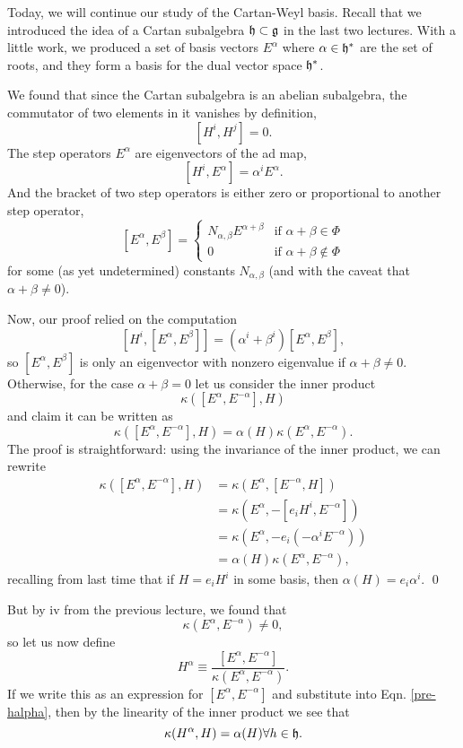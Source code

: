 Today, we will continue our study of the Cartan-Weyl basis. Recall that we introduced the idea of a Cartan subalgebra $\mathfrak{h}\subset \mathfrak{g}$ in the last two lectures. With a little work, we produced a set of basis vectors $E^\alpha$ where $\alpha\in \mathfrak{h}^*$ are the set of roots, and they form a basis for the dual vector space $\mathfrak{h}^*$.

We found that since the Cartan subalgebra is an abelian subalgebra, the commutator of two elements in it vanishes by definition,
$$[H^i,H^j]=0.$$
The step operators $E^\alpha$ are eigenvectors of the ad map,
$$[H^i,E^\alpha]=\alpha^i E^\alpha.$$
And the bracket of two step operators is either zero or proportional to another step operator,
$$[E^\alpha,E^\beta]=\begin{cases}
N_{\alpha,\beta}E^{\alpha+\beta} & \text{if }\alpha+\beta\in \Phi\\
0 & \text{if }\alpha+\beta\not\in \Phi
\end{cases}
$$
for some (as yet undetermined) constants $N_{\alpha,\beta}$ (and with the caveat that $\alpha+\beta\neq 0$).

Now, our proof relied on the computation
$$[H^i,[E^\alpha,E^\beta]]=(\alpha^i+\beta^i)[E^\alpha, E^\beta],$$
so $[E^\alpha,E^\beta]$ is only an eigenvector with nonzero eigenvalue if $\alpha+\beta \neq 0.$
Otherwise, for the case $\alpha+\beta=0$ let us consider the inner product
$$\kappa([E^\alpha,E^{-\alpha}],H)$$
and claim it can be written as
\begin{equation}\label{pre-halpha}
  \kappa([E^\alpha,E^{-\alpha}],H) =\alpha(H)\kappa(E^\alpha,E^{-\alpha}).
\end{equation}
The proof is straightforward: using the invariance of the inner product, we can rewrite
\begin{align*}
\kappa([E^\alpha,E^{-\alpha}],H)&=\kappa(E^\alpha,[E^{-\alpha},H])\\
&=\kappa(E^\alpha,-[e_i H^i,E^{-\alpha}])\\
&=\kappa(E^\alpha,-e_i (-\alpha^i E^{-\alpha}))\\
&=\alpha(H) \kappa(E^\alpha, E^{-\alpha}),
\end{align*}
recalling from last time that if $H = e_i H^i$ in some basis, then $\alpha(H) = e_i \alpha^i.$ \qed

But by iv from the previous lecture, we found that
$$\kappa(E^\alpha,E^{-\alpha})\neq 0,$$
so let us now define
$$H^\alpha\equiv \frac{[E^\alpha, E^{-\alpha}]}{\kappa(E^\alpha, E^{-\alpha})}.$$
If we write this as an expression for $[E^\alpha,E^{-\alpha}]$ and substitute into Eqn. \ref{pre-halpha}, then by the linearity of the inner product we see that
$$\kappa(H^\alpha,H)=\alpha(H)\forall h\in \mathfrak{h}.$$

